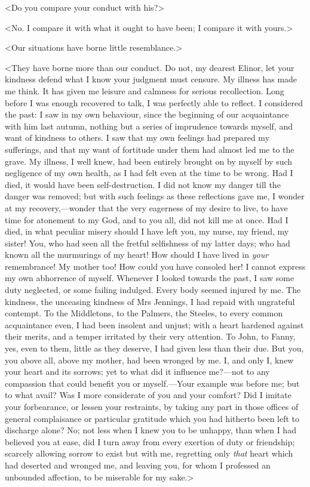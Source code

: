 <Do you compare your conduct with his?>

<No. I compare it with what it ought to have been; I compare it with yours.>

<Our situations have borne little resemblance.>

<They have borne more than our conduct. Do not, my dearest Elinor, let your kindness defend what I know your judgment must censure. My illness has made me think. It has given me leisure and calmness for serious recollection. Long before I was enough recovered to talk, I was perfectly able to reflect. I considered the past: I saw in my own behaviour, since the beginning of our acquaintance with him last autumn, nothing but a series of imprudence towards myself, and want of kindness to others. I saw that my own feelings had prepared my sufferings, and that my want of fortitude under them had almost led me to the grave. My illness, I well knew, had been entirely brought on by myself by such negligence of my own health, as I had felt even at the time to be wrong. Had I died, it would have been self-destruction. I did not know my danger till the danger was removed; but with such feelings as these reflections gave me, I wonder at my recovery,—wonder that the very eagerness of my desire to live, to have time for atonement to my God, and to you all, did not kill me at once. Had I died, in what peculiar misery should I have left you, my nurse, my friend, my sister! You, who had seen all the fretful selfishness of my latter days; who had known all the murmurings of my heart! How should I have lived in \textit{your} remembrance! My mother too! How could you have consoled her! I cannot express my own abhorrence of myself. Whenever I looked towards the past, I saw some duty neglected, or some failing indulged. Every body seemed injured by me. The kindness, the unceasing kindness of Mrs Jennings, I had repaid with ungrateful contempt. To the Middletons, to the Palmers, the Steeles, to every common acquaintance even, I had been insolent and unjust; with a heart hardened against their merits, and a temper irritated by their very attention. To John, to Fanny, yes, even to them, little as they deserve, I had given less than their due. But you, you above all, above my mother, had been wronged by me. I, and only I, knew your heart and its sorrows; yet to what did it influence me?—not to any compassion that could benefit you or myself.—Your example was before me; but to what avail? Was I more considerate of you and your comfort? Did I imitate your forbearance, or lessen your restraints, by taking any part in those offices of general complaisance or particular gratitude which you had hitherto been left to discharge alone? No; not less when I knew you to be unhappy, than when I had believed you at ease, did I turn away from every exertion of duty or friendship; scarcely allowing sorrow to exist but with me, regretting only \textit{that} heart which had deserted and wronged me, and leaving you, for whom I professed an unbounded affection, to be miserable for my sake.>

